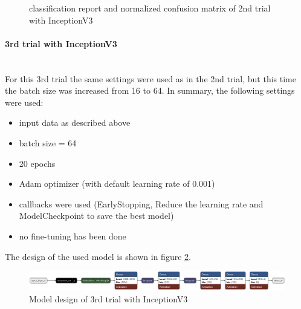\documentclass{article}
\begin{document}
\begin{figure}[!h]
  \centering
  \qquad
  \caption{classification report and normalized confusion matrix of 2nd trial with InceptionV3}
  \label{fig:inceptionv3_05_results}
\end{figure}

\paragraph{3rd trial with InceptionV3}\mbox{}\\
For this 3rd trial the same settings were used as in the 2nd trial, but this time the batch size was increased from 16 to 64. In summary, the following settings were used: 
\begin{itemize}
\item input data as described above
\item batch size = 64
\item 20 epochs 
\item Adam optimizer (with default learning rate of 0.001)
\item callbacks were used (EarlyStopping, Reduce the learning rate and ModelCheckpoint to save the best model)
\item no fine-tuning has been done
\end{itemize}

The design of the used model is shown in figure \ref{fig:inceptionv3_06.keras_model_design}.
\begin{figure}[ht] %
    \centering
    \includegraphics[width=1.0\linewidth]{inceptionv3_06.keras_model_design_nice.png}
    \caption{Model design of 3rd trial with InceptionV3}
    \label{fig:inceptionv3_06.keras_model_design}
\end{figure}
\end{document}
